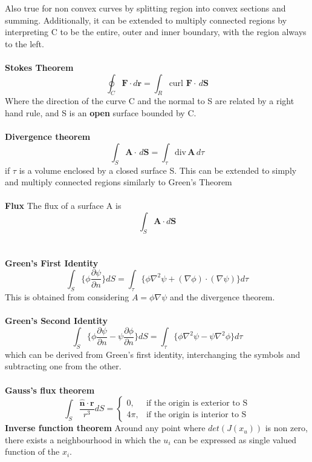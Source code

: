 \documentclass{article}
\begin{document}
Also true for non convex curves by splitting region into convex sections and summing. Additionally, it can be extended to multiply connected regions by interpreting C to be the entire, outer and inner boundary, with the region always to the left.
\\
\\
\textbf{Stokes Theorem}
$$
\oint_C \mathbf{F} \cdot d \mathbf{r} = \int_R \text{curl }  \mathbf{F} \cdot \hspace{2pt} d \mathbf{S}
$$
Where the direction of the curve C and the normal to S are related by a right hand rule, and S is an \textbf{open} surface bounded by C.
\\
\\
\textbf{Divergence theorem}
$$ 
\int_S \mathbf{A} \cdot \hspace{2pt} d\mathbf{S} = \int_\tau \text{div} \hspace{2pt} \mathbf{A} \hspace{2pt} d\tau
$$
if $\tau$ is a volume enclosed by a closed surface S. This can be extended to simply and multiply connected regions similarly to Green's Theorem
\\
\\
\textbf{Flux}
The flux of a surface A is $$ \int_S \mathbf{A} \cdot d \mathbf{S}$$
\\
\\
\textbf{Green's First Identity}
$$
\int_S \bigg \{ \phi \frac{\partial \psi}{\partial n}\bigg \} dS = \int_\tau \big \{ \phi \nabla^2 \psi + (\nabla \phi) \cdot (\nabla \psi) \big \} d\tau
$$ This is obtained from considering $A = \phi \nabla \psi $ and the divergence theorem.
\\
\\
\textbf{Green's Second Identity}
$$
\int_S \bigg \{ \phi \frac{\partial \psi}{\partial n} - \psi \frac{\partial \phi}{\partial n}\bigg \} dS = \int_\tau \big \{ \phi \nabla^2 \psi - \psi \nabla^2 \phi \big \} d\tau
$$ which can be derived from Green's first identity, interchanging the symbols and subtracting one from the other. 
\\
\\
\textbf{Gauss's flux theorem}
$$
\int_S \frac{\mathbf{\hat{n} \cdot r}}{r^3} dS = \begin{cases} 0, & \text{if the origin is exterior to S} \\ 4\pi, & \text{if the origin is interior to S}\end{cases}
$$
\textbf{Inverse function theorem}
Around any point where $det(J(x_u))$ is non zero, there exists a neighbourhood in which the $u_i$ can be expressed as single valued function of the $x_i$.
\end{document}
